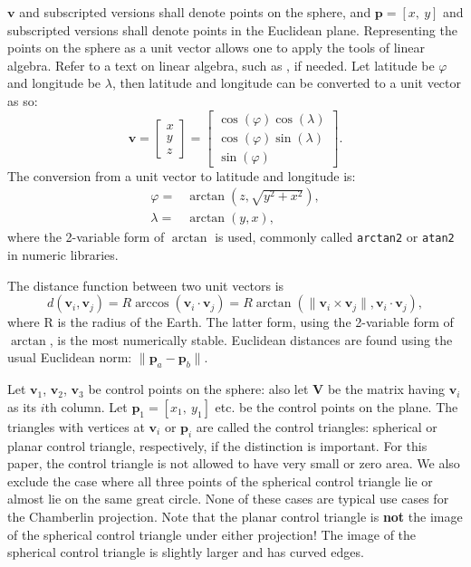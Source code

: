 \documentclass[]{interact}
\begin{document}
$\mathbf v$ and subscripted versions shall denote points on the sphere, and
$\mathbf p = [x,~y]$ and subscripted versions shall denote points in the
Euclidean plane. Representing the points on the sphere as a unit vector allows
one to apply the tools of linear algebra. Refer to a text on linear algebra,
such as \citet{strang80}, if needed. Let latitude be $\varphi$ and longitude be
$\lambda$, then latitude and longitude can be converted to a unit vector as so:
\citep{kent}
\begin{equation}
\mathbf v =
\begin{bmatrix*}
  x \\y\\ z
\end{bmatrix*}
=
\begin{bmatrix*}
 \cos(\varphi) \cos(\lambda) \\
 \cos(\varphi) \sin(\lambda) \\
 \sin(\varphi)
\end{bmatrix*}.
\end{equation}
The conversion from a unit vector to latitude and longitude is:
\begin{equation}\begin{split}
  \varphi =& \arctan\left(z, \sqrt{y^2 + x^2}\right), \\
  \lambda =& \arctan\left(y, x\right),
\end{split}\end{equation}
where the 2-variable form of $\arctan$ is used, commonly called \texttt{arctan2}
or \texttt{atan2} in numeric libraries.

The distance function between two unit vectors is
\begin{equation}
d\left(\mathbf v_i, \mathbf v_j\right) = R \arccos\left(\mathbf v_i \cdot \mathbf v_j\right)
= R \arctan\left(\|\mathbf v_i \times \mathbf v_j\|, \mathbf v_i \cdot \mathbf v_j\right),
\end{equation}
where R is the radius of the Earth. The latter form, using the 2-variable form
of $\arctan$, is the most numerically stable. Euclidean distances are found
using the usual Euclidean norm: $\|\mathbf p_a - \mathbf p_b\|$.

Let $\mathbf v_1$, $\mathbf v_2$, $\mathbf v_3$ be control points on the sphere:
also let $\mathbf V$ be the matrix having $\mathbf v_i$ as its $i$th column. Let
$\mathbf p_1 = [x_1,~y_1]$ etc. be the control points on the plane. The
triangles with vertices at $\mathbf v_i$ or $\mathbf p_i$ are called the
control triangles: spherical or planar control triangle, respectively, if the
distinction is important. For this paper, the control triangle is not allowed
to have very small or zero area. We also exclude the case where all three
points of the spherical control triangle lie or almost lie on the same great
circle. None of these cases are typical use cases for the Chamberlin
projection. Note that the planar control triangle is \textbf{not} the
image of the spherical control triangle under either projection! The image
of the spherical control triangle is slightly larger and has curved edges.
\end{document}
